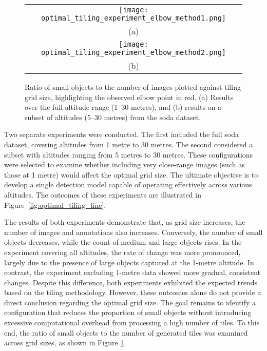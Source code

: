 \begin{figure}[!ht]
  \centering
  \begin{tabular}{c}
    \texttt{[image: optimal\_tiling\_experiment\_elbow\_method1.png]} \\
    \small (a) \\
    \addlinespace[1em]
    \texttt{[image: optimal\_tiling\_experiment\_elbow\_method2.png]} \\
    \small (b) \\
  \end{tabular}
  \caption{Ratio of small objects to the number of images plotted against tiling grid size, highlighting the observed elbow point in red. (a) Results over the full altitude range (1--30 metres), and (b) results on a subset of altitudes (5--30 metres) from the \gls{soda} dataset.}
  \label{fig:elbow_plot}
\end{figure}

Two separate experiments were conducted. The first included the full \gls{soda} dataset, covering altitudes from 1 metre to 30 metres. The second considered a subset with altitudes ranging from 5 metres to 30 metres. These configurations were selected to examine whether including very close-range images (such as those at 1 metre) would affect the optimal grid size. The ultimate objective is to develop a single detection model capable of operating effectively across various altitudes. The outcomes of these experiments are illustrated in Figure~\ref{fig:optimal_tiling_line}.

The results of both experiments demonstrate that, as grid size increases, the number of images and annotations also increases. Conversely, the number of small objects decreases, while the count of medium and large objects rises. In the experiment covering all altitudes, the rate of change was more pronounced, largely due to the presence of large objects captured at the 1-metre altitude. In contrast, the experiment excluding 1-metre data showed more gradual, consistent changes. Despite this difference, both experiments exhibited the expected trends based on the tiling methodology.
However, these outcomes alone do not provide a direct conclusion regarding the optimal grid size. The goal remains to identify a configuration that reduces the proportion of small objects without introducing excessive computational overhead from processing a high number of tiles. To this end, the ratio of small objects to the number of generated tiles was examined across grid sizes, as shown in Figure \ref{fig:elbow_plot}.

